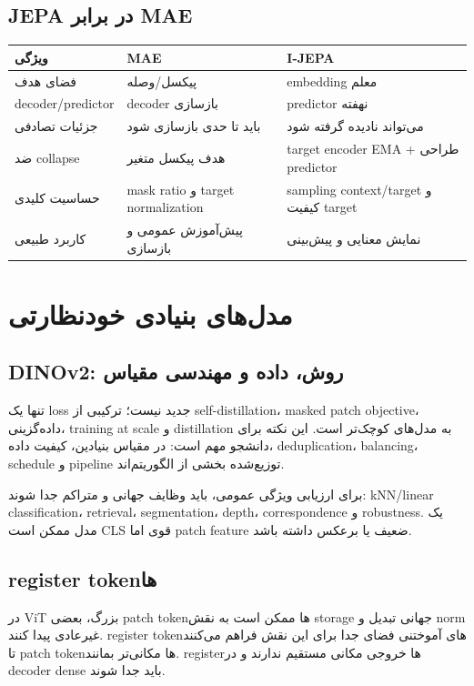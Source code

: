 \documentclass[12pt,openany,oneside]{book}
\begin{document}
\subsection{JEPA در برابر MAE}
\begin{longtable}{p{31mm}p{51mm}p{51mm}}
\toprule
ویژگی & MAE & I-JEPA \\
\midrule
فضای هدف & پیکسل/وصله & embedding معلم \\
decoder/predictor & decoder بازسازی & predictor نهفته \\
جزئیات تصادفی & باید تا حدی بازسازی شود & می‌تواند نادیده گرفته شود \\
ضد collapse & هدف پیکسل متغیر & target encoder EMA + طراحی predictor \\
حساسیت کلیدی & mask ratio و target normalization & sampling context/target و کیفیت target \\
کاربرد طبیعی & پیش‌آموزش عمومی و بازسازی & نمایش معنایی و پیش‌بینی \\
\bottomrule
\end{longtable}

\section{مدل‌های بنیادی خودنظارتی}
\subsection{DINOv2: روش، داده و مهندسی مقیاس}
 تنها یک loss جدید نیست؛ ترکیبی از self-distillation، masked patch objective، داده‌گزینی، training at scale و distillation به مدل‌های کوچک‌تر است. این نکته برای دانشجو مهم است: در مقیاس بنیادین، کیفیت داده، deduplication، balancing، schedule و pipeline توزیع‌شده بخشی از الگوریتم‌اند.

برای ارزیابی ویژگی عمومی، باید وظایف جهانی و متراکم جدا شوند: kNN/linear classification، retrieval، segmentation، depth، correspondence و robustness. یک مدل ممکن است CLS قوی اما patch feature ضعیف یا برعکس داشته باشد.

\subsection{register tokenها}
در ViT بزرگ، بعضی patch tokenها ممکن است به نقش storage جهانی تبدیل و norm غیرعادی پیدا کنند. register tokenهای آموختنی فضای جدا برای این نقش فراهم می‌کنند تا patch tokenها مکانی‌تر بمانند. registerها خروجی مکانی مستقیم ندارند و در decoder dense باید جدا شوند.
\end{document}
